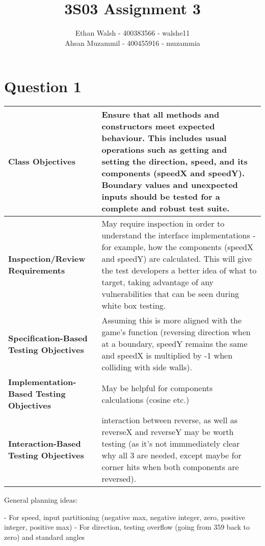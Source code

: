 \documentclass{article}
\title{3S03 Assignment 3}
\author{Ethan Walsh - 400383566 - walshe11 \\ Ahsan Muzammil - 400455916 - muzammia}
\begin{document}
\maketitle
\section*{Question 1}

\begin{table}[h]
    \renewcommand{\arraystretch}{1.2}
    \setlength{\extrarowheight}{2pt} 
    \centering
    \begin{tabularx}{\textwidth}{ |X|X| } 
        \hline
        \textbf{Class Objectives} & Ensure that all methods and constructors meet expected behaviour. This includes usual operations such as getting and setting the direction, speed, and its components (speedX and speedY). Boundary values and unexpected inputs should be tested for a complete and robust test suite. \\ 
        \hline
        \textbf{Inspection/Review Requirements} & May require inspection in order to understand the interface implementations - for example, how the components (speedX and speedY) are calculated. This will give the test developers a better idea of what to target, taking advantage of any vulnerabilities that can be seen during white box testing. \\ 
        \hline
        \textbf{Specification-Based Testing Objectives} & Assuming this is more aligned with the game's function (reversing direction when at a boundary, speedY remains the same and speedX is multiplied by -1 when colliding with side walls). \\ 
        \hline
        \textbf{Implementation-Based Testing Objectives} & May be helpful for components calculations (cosine etc.) \\ 
        \hline
        \textbf{Interaction-Based Testing Objectives} & interaction between reverse, as well as reverseX and reverseY may be worth testing (as it's not immmediately clear why all 3 are needed, except maybe for corner hits when both components are reversed). \\ 
        \hline
    \end{tabularx}
\end{table}

General planning ideas:

- For speed, input partitioning (negative max, negative integer, zero, positive integer, positive max)
- For direction, testing overflow (going from 359 back to zero) and standard angles
\end{document}
